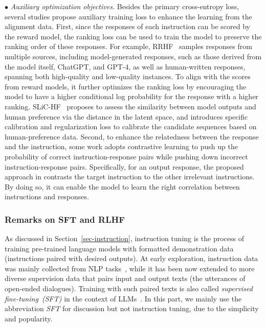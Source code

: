 {$\bullet$ \textit{Auxiliary optimization objectives.} Besides the primary cross-entropy loss, several studies propose auxiliary training loss to enhance the learning from the alignment data. First, since the responses of each instruction can be scored by the reward model, the ranking loss can be used to train the model to preserve the ranking order of these responses. For example, RRHF~\cite{Yuan-RRHF-2023-arxiv} samples responses from multiple sources, including model-generated responses, such as those derived from the model itself, ChatGPT, and GPT-4, as well as human-written responses, spanning both high-quality and low-quality instances.   To align with the scores from reward models, it further optimizes the ranking loss by encouraging the model to have a higher conditional log probability for the response with a higher ranking.  {SLiC-HF~\cite{Zhao-arxiv-2023-slichf} proposes to assess the similarity between model outputs and human preference via the distance in the latent space,  and introduces specific calibration and regularization loss to calibrate the candidate sequences based on human-preference data.} Second, to enhance the relatedness between the response and the instruction, some work adopts contrastive learning to push up the probability of correct instruction-response pairs while pushing down incorrect instruction-response pairs. Specifically, for an output response, the proposed approach in \cite{Zhang-arxiv-2023-The} contrasts the target instruction to the other irrelevant instructions. By doing so, it can enable the model to learn the right correlation between instructions and responses.





%


\subsubsection{Remarks on SFT and RLHF}
\label{sec-remarks-SFTRL}
As discussed in Section~\ref{sec-instruction}, instruction  tuning is the process of training pre-trained language models with
formatted demonstration data (instructions paired with desired outputs). At early exploration,   instruction data was mainly collected from NLP  tasks~\cite{Wei-ICLR-2022-Finetuned}, while it has been now extended to more diverse supervision data  that pairs input and output texts (\eg the utterances of open-ended dialogues). Training with such paired texts is also  called \emph{supervised fine-tuning~(SFT)} in the context of LLMs~\cite{Ouyang-arxiv-2022-Training}. 
In this part, we mainly use the abbreviation  \emph{SFT} for discussion but not instruction tuning, due to the simplicity and popularity. 

}
